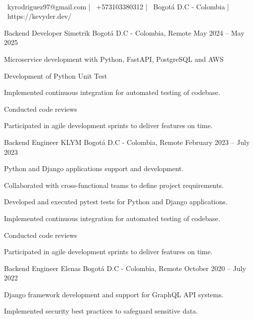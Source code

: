 \documentclass[]{awesome-cv}
\begin{document}
\begin{center}
	  \\
	\vspace{2mm}
	{\faEnvelope\ kyrodriguez97@gmail.com} | {\faMobile\ +573103380312} | {\faMapMarker\ Bogotá D.C - Colombia} | {\faLink\ https://kevyder.dev/}
\end{center}
\begin{cventries}
	\cventry
	{Backend Developer}
	{Simetrik}
	{Bogotá D.C - Colombia, Remote}
	{May 2024 – May 2025}
	{\begin{cvitems}
		\item {Microservice development with Python, FastAPI, PostgreSQL and AWS}
		\item {Development of Python Unit Test}
		\item {Implemented continuous integration for automated testing of codebase.}
		\item {Conducted code reviews}
		\item {Participated in agile development sprints to deliver features on time.}
		\end{cvitems}}
	\cventry
	{Backend Engineer}
	{KLYM}
	{Bogotá D.C - Colombia, Remote}
	{February 2023 – July 2023}
	{\begin{cvitems}
		\item {Python and Django applications support and development.}
		\item {Collaborated with cross-functional teams to define project requirements.}
		\item {Developed and executed pytest tests for Python and Django applications.}
		\item {Implemented continuous integration for automated testing of codebase.}
		\item {Conducted code reviews}
		\item {Participated in agile development sprints to deliver features on time.}
		\end{cvitems}}
	\cventry
	{Backend Engineer}
	{Elenas}
	{Bogotá D.C - Colombia, Remote}
	{October 2020 – July 2022}
	{\begin{cvitems}
		\item {Django framework development and support for GraphQL API systems.}
		\item {Implemented security best practices to safeguard sensitive data.}

\end{cvitems}}
\end{cventries}
\end{document}
